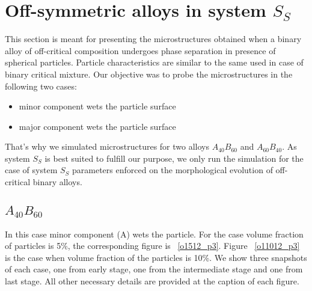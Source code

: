 \documentclass[12pt]{iiscthes}
\theoremstyle{definition}
\theoremstyle{definition}
\theoremstyle{remark}
\begin{document}
\section{Off-symmetric alloys in system $S_S$}\label{ocmic}
This section is meant for presenting the microstructures obtained when a binary alloy of off-critical composition undergoes phase separation in presence of spherical particles. Particle characteristics are similar to the same used in case of binary critical mixture. Our objective was to probe the microstructures in the following two cases:
\begin{itemize}
\item minor component wets the particle surface 
\item major component wets the particle surface
\end{itemize} 
That's why we simulated microstructures for two alloys $A_{40}B_{60}$ and $A_{60}B_{40}$. As system $S_S$ is best suited to fulfill our purpose, we only run the simulation for the case of system $S_S$ parameters enforced on the morphological evolution of off-critical binary alloys. 
\subsection{$A_{40}B_{60}$}
 In this case minor component (A) wets the particle. For the case volume fraction of particles is 5\%, the corresponding figure is ~\ref{o1512_p3}. Figure ~\ref{o11012_p3} is the case when volume fraction of the particles is 10\%.  We show three snapshots of each case, one from early stage, one from the intermediate stage and one from last stage. All other necessary details are provided at the caption of each figure.
 
\end{document}
